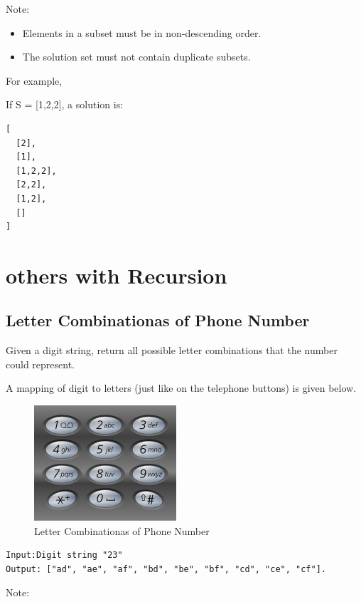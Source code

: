 \documentclass[11pt]{book}
\begin{document}
Note:
\begin{itemize}
\item Elements in a subset must be in non-descending order.
\item The solution set must not contain duplicate subsets.
\end{itemize}
For example,

If S = [1,2,2], a solution is:
\lstset{language=java,label= ,caption= ,numbers=none}
\begin{lstlisting}
[
  [2],
  [1],
  [1,2,2],
  [2,2],
  [1,2],
  []
]
\end{lstlisting}
\section{others with Recursion}
\label{sec-16-4}
\subsection{Letter Combinationas of Phone Number}
\label{sec-16-4-1}
Given a digit string, return all possible letter combinations that the number could represent.

A mapping of digit to letters (just like on the telephone buttons) is given below.

\begin{figure}[htb]
\centering
\includegraphics[width=.9\linewidth]{./pic/phoneNumber.png}
\caption{Letter Combinationas of Phone Number}
\end{figure}
\lstset{language=java,label= ,caption= ,numbers=none}
\begin{lstlisting}
Input:Digit string "23"
Output: ["ad", "ae", "af", "bd", "be", "bf", "cd", "ce", "cf"].
\end{lstlisting}
Note:
\end{document}
